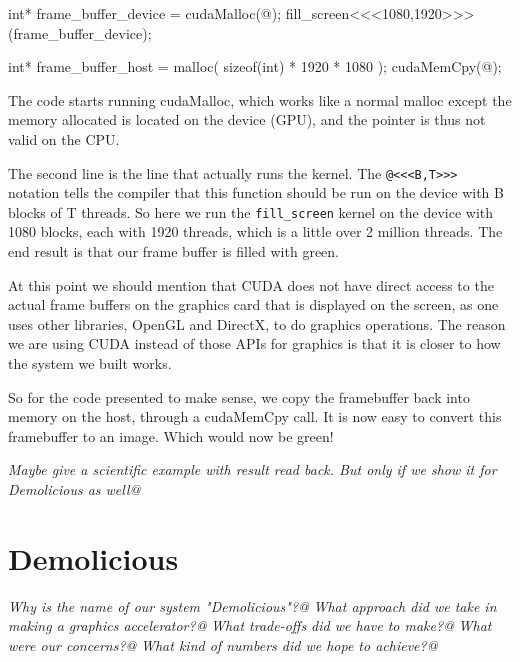 \documentclass[../main/report.tex]{subfiles}
\begin{document}
\begin{c-code}[caption=Starting the CUDA kernel with one thread per pixel, label=cuda-kernel-launch]
int* frame_buffer_device = cudaMalloc(@);
fill_screen<<<1080,1920>>>(frame_buffer_device);

int* frame_buffer_host = malloc( sizeof(int) * 1920 * 1080 );
cudaMemCpy(@);
\end{c-code}

The code starts running cudaMalloc, which works like a normal malloc except the memory allocated is located on the device (GPU), and the pointer is thus not valid on the CPU.

The second line is the line that actually runs the kernel.
The \verb/@<<<B,T>>>/ notation tells the compiler that this function should be run on the device with B blocks of T threads.
So here we run the \verb/fill_screen/ kernel on the device with 1080 blocks, each with 1920 threads, which is a little over 2 million threads.
The end result is that our frame buffer is filled with green.

At this point we should mention that CUDA does not have direct access to the actual frame buffers on the graphics card that is displayed on the screen, as one uses other libraries, OpenGL and DirectX, to do graphics operations. 
The reason we are using CUDA instead of those APIs for graphics is that it is closer to how the system we built works.

So for the code presented to make sense, we copy the framebuffer back into memory on the host, through a cudaMemCpy call.
It is now easy to convert this framebuffer to an image.
Which would now be green! 







\emph{Maybe give a scientific example with result read back. But only if we show it for Demolicious as well@}


\section{Demolicious}

\textit{Why is the name of our system "Demolicious"?@}
\textit{What approach did we take in making a graphics accelerator?@}
\textit{What trade-offs did we have to make?@}
\textit{What were our concerns?@}
\textit{What kind of numbers did we hope to achieve?@}
\end{document}
